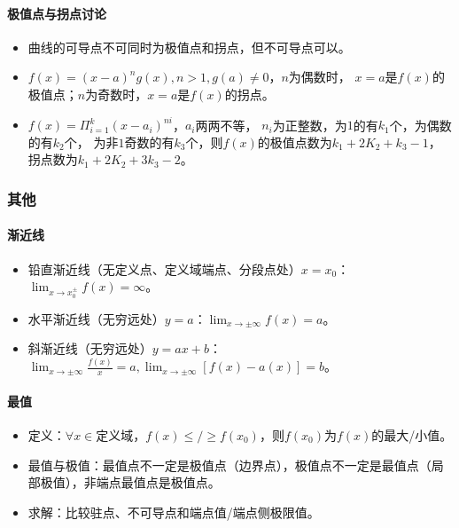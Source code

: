 \documentclass[
12pt, %
a4paper, 
oneside, %
headinclude,footinclude, %
]{scrartcl}
\begin{document}
\paragraph{极值点与拐点讨论}
\begin{itemize}
\item 曲线的可导点不可同时为极值点和拐点，但不可导点可以。
\item $ f(x) = (x - a)^n g(x), n > 1, g(a) \neq 0 $，$ n $为偶数时，
$ x = a $是$ f(x) $的极值点；$ n $为奇数时，$ x = a $是$ f(x) $的拐点。
\item $ f(x) = \Pi_{i = 1}^k (x - a_i)^{ni} $，$ a_i $两两不等，
$ n_i $为正整数，为$ 1 $的有$ k_1 $个，为偶数的有$ k_2 $个，
为非$ 1 $奇数的有$ k_3 $个，则$ f(x) $的极值点数为$ k_1 + 2K_2 + k_3 - 1 $，
拐点数为$ k_1 + 2K_2 + 3k_3 - 2 $。
\end{itemize}
\subsubsection[其他]{其他}
\paragraph{渐近线}
\begin{itemize}
\item 铅直渐近线（无定义点、定义域端点、分段点处）$ x = x_0 $：$ \lim_{x \to x_0^{\pm}} f(x) = \infty $。
\item 水平渐近线（无穷远处）$ y = a $：$ \lim_{x \to \pm \infty} f(x) = a $。
\item 斜渐近线（无穷远处）$ y = ax + b $：$ \lim_{x \to \pm \infty} \frac{f(x)}{x} = a, \lim_{x \to \pm \infty} [f(x) - a(x)] = b $。
\end{itemize}
\paragraph{最值}
\begin{itemize}
\item 定义：$ \forall x \in $定义域，$ f(x) \leq / \geq f(x_0) $，则$ f(x_0) $为$ f(x) $的最大/小值。
\item 最值与极值：最值点不一定是极值点（边界点），极值点不一定是最值点（局部极值），非端点最值点是极值点。
\item 求解：比较驻点、不可导点和端点值/端点侧极限值。
\end{itemize}
\end{document}
